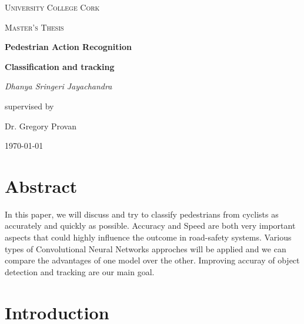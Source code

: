 \documentclass[11pt]{article}\usepackage[]{graphicx}\usepackage[]{color}
\begin{document}
\begin{titlepage}
\centering
{\scshape\LARGE University College Cork\par}
\vspace{1cm}
{\scshape\Large Master's Thesis \par}
\vspace{1.5cm}
{\huge\bfseries Pedestrian Action Recognition\par}  
\vspace{0.5cm}
{\Large\bfseries Classification and tracking \par}
\vspace{2cm}
{\Large\itshape Dhanya Sringeri Jayachandra \par}
\vfill
supervised by\par
Dr. Gregory Provan
\vfill
{\large \today\par}
\end{titlepage}

\setcounter{tocdepth}{2}
\tableofcontents
\clearpage
\listoftables
\listoffigures
\clearpage

\section{Abstract}

In this paper, we will discuss and try to classify pedestrians from cyclists as accurately and quickly as possible. Accuracy and Speed are both very important aspects that could highly influence the outcome in road-safety systems. Various types of Convolutional Neural Networks approches will be applied and we can compare the advantages of one model over the other. Improving accuray of object detection and tracking are our main goal.

\section{Introduction}
\end{document}
